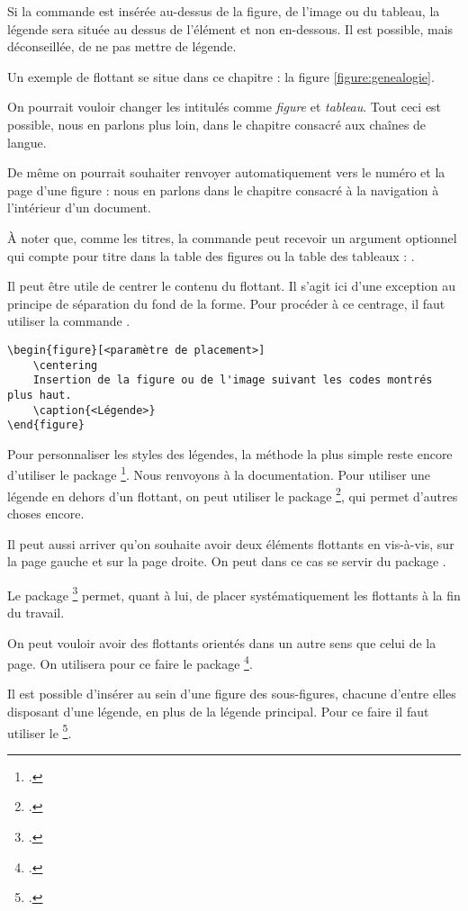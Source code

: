 Si la commande  est insérée au-dessus de la figure, de l'image ou du tableau, la légende sera située au dessus de l'élément et non en-dessous. Il est possible, mais déconseillée, de ne pas mettre de légende.

Un exemple de flottant se situe  dans ce chapitre : la figure \ref{figure:genealogie}.
\begin{attention}
	On pourrait vouloir changer les intitulés comme \emph{figure} et \emph{tableau}. Tout ceci est possible, nous en parlons plus loin, dans le chapitre consacré aux chaînes de langue.
	
	De même on pourrait souhaiter renvoyer automatiquement vers le numéro et la page d'une figure : nous en parlons dans le chapitre consacré à la navigation à l'intérieur d'un document.
\end{attention}

À noter que, comme les titres, la commande  peut recevoir un argument optionnel qui compte pour titre dans la table des figures ou la table des tableaux :
.


\begin{plusloins}

Il peut être utile de centrer le contenu du flottant. Il s'agit ici d'une exception au principe de séparation du fond de la forme. Pour procéder à ce centrage, il faut utiliser la commande .

\begin{verbatim}
\begin{figure}[<paramètre de placement>]
	\centering
	Insertion de la figure ou de l'image suivant les codes montrés plus haut.
	\caption{<Légende>}
\end{figure} 
\end{verbatim}


Pour personnaliser les styles des légendes, la méthode la plus simple reste encore d'utiliser le package \footcite{caption}. Nous renvoyons à la documentation.
Pour utiliser une légende en dehors d'un flottant, on peut utiliser le package \footcite{ccaption}, qui permet d'autres choses encore.

Il peut aussi arriver qu'on souhaite avoir deux éléments flottants en vis-à-vis, sur la page gauche et sur la page droite. On peut dans ce cas se servir du package .

Le package \footcite{endfloat} permet, quant à lui, de placer systématiquement les flottants à la fin du travail.

On peut vouloir avoir des flottants orientés dans un autre sens que celui de la page. On utilisera pour ce faire le package \footcite{rotfloat}.

Il est possible d'insérer au sein d'une figure des sous-figures, chacune d'entre elles disposant d'une légende, en plus de la légende principal.
Pour ce faire il faut utiliser le  \footcite{subcaption}.
\end{plusloins}



